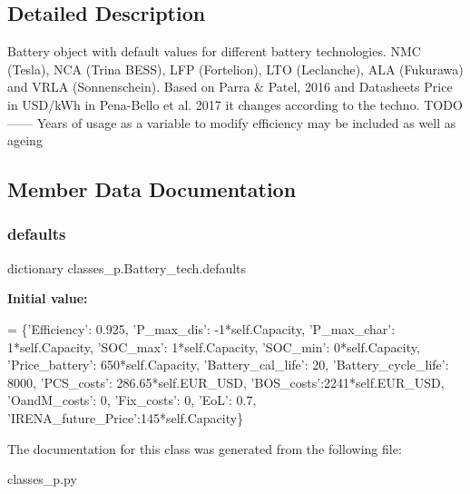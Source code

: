 \subsection{Detailed Description}
\begin{DoxyVerb}Battery object with default values for different battery technologies.
NMC (Tesla), NCA (Trina BESS), LFP (Fortelion), LTO (Leclanche),
ALA (Fukurawa) and VRLA (Sonnenschein).
Based on Parra & Patel, 2016 and Datasheets
Price in USD/kWh in Pena-Bello et al. 2017 it changes according to the techno.
TODO
------
Years of usage as a variable to modify efficiency may be included as well as ageing
\end{DoxyVerb}
 

\subsection{Member Data Documentation}
\mbox{\label{classclasses__p_1_1_battery__tech_a4ed0be6cfed52f6eea827d0b251c302d}} 
\subsubsection{\texorpdfstring{defaults}{defaults}}
{\footnotesize\ttfamily dictionary classes\+\_\+p.\+Battery\+\_\+tech.\+defaults\hspace{0.3cm}{\ttfamily [static]}}

{\bfseries Initial value\+:}
\begin{DoxyCode}
=  \{\textcolor{stringliteral}{'Efficiency'}: 0.925,
                \textcolor{stringliteral}{'P\_max\_dis'}: -1*self.Capacity,
                \textcolor{stringliteral}{'P\_max\_char'}: 1*self.Capacity,
                \textcolor{stringliteral}{'SOC\_max'}: 1*self.Capacity,
                \textcolor{stringliteral}{'SOC\_min'}: 0*self.Capacity,
                \textcolor{stringliteral}{'Price\_battery'}: 650*self.Capacity,
                \textcolor{stringliteral}{'Battery\_cal\_life'}: 20,
                \textcolor{stringliteral}{'Battery\_cycle\_life'}: 8000,
                \textcolor{stringliteral}{'PCS\_costs'}: 286.65*self.EUR\_USD,
                \textcolor{stringliteral}{'BOS\_costs'}:2241*self.EUR\_USD,
                \textcolor{stringliteral}{'OandM\_costs'}: 0,
                \textcolor{stringliteral}{'Fix\_costs'}: 0,
                \textcolor{stringliteral}{'EoL'}: 0.7,
                \textcolor{stringliteral}{'IRENA\_future\_Price'}:145*self.Capacity\}
\end{DoxyCode}


The documentation for this class was generated from the following file\+:\begin{DoxyCompactItemize}
\item 
classes\+\_\+p.\+py\end{DoxyCompactItemize}
